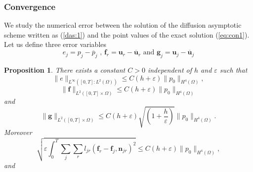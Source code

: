 \documentclass[a4paper,french,english,10pt]{article}
\newcommand\ljr{l_{jr}}
\newcommand\njr{\mathbf{n}_{jr}}
\newcommand\uu{\mathbf{u}}
\newcommand\eps{\varepsilon}
\newcommand\pej{\overline{p}_j}
\newcommand\uej{\overline{\uu}_j}
\newcommand\uer{\overline{\uu}_r}
\newcommand\uj{\uu_j}
\newcommand\ur{\uu_r}
\newcommand\fj{\mathbf{f}_j}
\newcommand\fr{\mathbf{f}_r}
\newcommand\ff{\mathbf{f}}
\newcommand\gf{\mathbf{g}}
\newtheorem{proposition}[theorem]{Proposition}
\begin{document}
\subsubsection{Convergence}

We study the numerical error between the solution of the %
diffusion asymptotic scheme written as (\ref{das:1}) and the point values
of the exact solution (\ref{eq:con1}).
Let us define  three  error variables 
$$
e_j= p_j -\pej
\mbox{ , }
\fr = \ur -\uer
\mbox{ and }
\mathbf g_j = \uj -\uej
$$ 

 
\begin{proposition} \label{theor:main0}
There  exists a  constant
$C>0$ independent of $h$ and $\varepsilon$ such that 
\begin{equation} \label{eq:dconv1}
 \| e \|_{L^\infty(  [0,T]: L^2(\Omega) )}
 \leq C(h+\eps) \| p_0  \|_{H^4(\Omega)} ,
\end{equation}
\begin{equation} \label{eq:dconv2}
 \| \ff \|_{L^2([0,T]\times \Omega)} \leq C (h+\eps)  
\| p_0  \|_{H^4(\Omega)}  
\end{equation}
and
     \begin{equation} \label{eq:dconv4}
\| \gf \|_{L^2([0,T]\times \Omega)} \leq C (h+\eps)\sqrt{(1+\frac
h\eps )} \| p_0  \|_{H^4(\Omega)} . 
\end{equation}
Moreover                                                           
\begin{equation} \label{eq:dconv3}
\sqrt{\eps \int_0^T \sum_j \sum_r    \ljr \left( \fr  -
\fj ,\njr \right)^2 } \leq C (h+\eps)\| p_0  \|_{H^4(\Omega)} , 
 \end{equation}
and 
\end{proposition}
\end{document}
